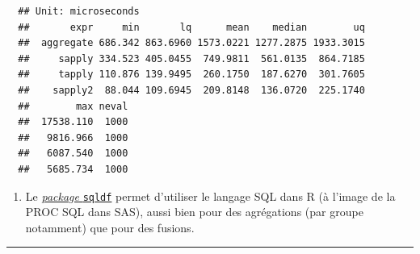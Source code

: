 \documentclass[12pt,twosided, notitlepage]{book}
\newenvironment{Shaded}{}{}
\newcommand{\KeywordTok}[1]{\textcolor[rgb]{0.00,0.00,1.00}{{#1}}}
\newcommand{\DataTypeTok}[1]{{#1}}
\newcommand{\DecValTok}[1]{{#1}}
\newcommand{\CommentTok}[1]{\textcolor[rgb]{0.00,0.50,0.00}{{#1}}}
\newcommand{\NormalTok}[1]{{#1}}
\providecommand{\tightlist}{%
  \setlength{\itemsep}{0pt}\setlength{\parskip}{0pt}}
\renewenvironment{Shaded}{\begin{snugshade}}{\end{snugshade}}
\begin{document}
\begin{Shaded}
\end{Shaded}

\begin{verbatim}
  ## Unit: microseconds
  ##       expr     min       lq      mean    median        uq
  ##  aggregate 686.342 863.6960 1573.0221 1277.2875 1933.3015
  ##     sapply 334.523 405.0455  749.9811  561.0135  864.7185
  ##     tapply 110.876 139.9495  260.1750  187.6270  301.7605
  ##    sapply2  88.044 109.6945  209.8148  136.0720  225.1740
  ##        max neval
  ##  17538.110  1000
  ##   9816.966  1000
  ##   6087.540  1000
  ##   5685.734  1000
\end{verbatim}

\begin{enumerate}
\def\labelenumi{\arabic{enumi}.}
\setcounter{enumi}{2}
\tightlist
\item
  Le
  \href{http://www.gettinggeneticsdone.com/2010/05/use-sql-queries-to-manipulate-data.html}{\emph{package}
  \texttt{sqldf}} permet d'utiliser le langage SQL dans R (à l'image de
  la PROC SQL dans SAS), aussi bien pour des agrégations (par groupe
  notamment) que pour des fusions.
\end{enumerate}

\begin{center}\rule{0.5\linewidth}{\linethickness}\end{center}

~
\end{document}
